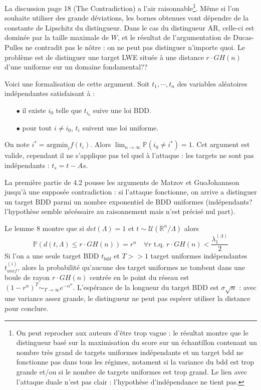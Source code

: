 \documentclass{article}
\begin{document}
\subsubsection{}

La discussion page 18 (The Contradiction) a l'air raisonnable\footnote{On peut reprocher aux auteurs d'être trop vague : le résultat montre que le distingueur basé sur la maximisation du score sur un échantillon contenant un nombre très grand de targets uniformes indépendants et un target bdd ne fonctionne pas dans tous les régimes, notament si la variance du bdd est trop grande et/ou si le nombre de targets uniformes est trop grand. Le lien avec l'attaque duale n'est pas clair : l'hypothèse d'indépendance ne tient pas.}. Même si l'on souhaite utiliser des grande déviations, les bornes obtenues vont dépendre de la constante de Lipschitz du distingueur. Dans le cas du distingueur AR, celle-ci est dominée par la taille maximale de $W$, et le résultat de l'argumentation de Ducas-Pulles ne contradit pas le nôtre : on ne peut pas distinguer n'importe quoi. Le problème est de distinguer une target LWE située à une distance $r\cdot GH(n)$ d'une uniforme sur un domaine fondamental?? 

Voici une formalisation de cette argument. Soit $t_1,\cdots ,t_n$ des variables aléatoires indépendantes satisfaisant à :
\begin{itemize}
\item[$\bullet$] il existe $i_0$ telle que $t_{i_0}$ suive une loi BDD.
\item[$\bullet$] pour tout $i\neq i_0$, $t_i$ suivent une loi uniforme.
\end{itemize}
On note $i^* = \text{argmin}_i f(t_i) . $
Alors $\lim_{n\rightarrow \infty } \mathbb P(i_0\neq i^* ) =1$. Cet argument est valide, cependant il ne s'applique pas tel quel à l'attaque : les targets ne sont pas indépendants : $t_s = t - As $.

La première partie de 4.2 pousse les arguments de Matzov et GuoJohannson jusqu'à une supposée contradiction : si l'attaque fonctionne, on arrive a distinguer un target BDD parmi un nombre exponentiel de BDD uniformes (indépendants? l'hypothèse semble nécéssaire au raisonnement mais n'est précisé nul part).  

Le lemme 8 montre que si $det(\Lambda) = 1$ et $t\sim\mathcal U(\mathbb R^n /\Lambda)$ alors
$$\mathbb P( d(t , \Lambda ) \leq r\cdot GH(n) ) =  r^n \quad \forall r \text{ t.q. } r \cdot GH(n) < \frac{\lambda_1^{(\Lambda)}}{2}$$
Si l'on a une seule target BDD $t_{bdd}$ et $T>>1$ target uniformes indépendantes $t^{(i)}_{unif}$, alors la probabilité qu'aucune des target uniformes ne tombent dans une boule de rayon $r\cdot GH(n)$ centrée en le point du réseau est $(1-r^n)^T \sim_{T\rightarrow \infty} e^{-\alpha^n}$. L'espérance de la longueur du target BDD est $\sigma \sqrt n $ : avec une variance assez grande, le distingueur ne peut pas espérer utiliser la distance pour conclure.
\end{document}
